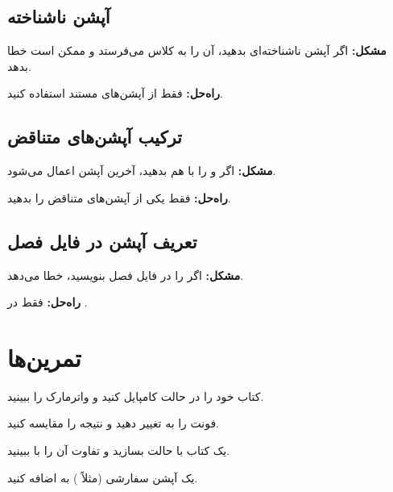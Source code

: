 \subsection{آپشن ناشناخته}
\label{sec:options-mistake-unknown}

\textbf{مشکل:} اگر آپشن ناشناخته‌ای بدهید،
 آن را به کلاس  می‌فرستد
و ممکن است خطا بدهد.

\textbf{راه‌حل:} فقط از آپشن‌های مستند استفاده
کنید.

\subsection{ترکیب آپشن‌های متناقض}
\label{sec:options-mistake-conflict}

\textbf{مشکل:} اگر  و  را
با هم بدهید، آخرین آپشن اعمال می‌شود.

\textbf{راه‌حل:} فقط یکی از آپشن‌های متناقض
را بدهید.

\subsection{تعریف آپشن در فایل فصل}
\label{sec:options-mistake-chapter}

\textbf{مشکل:} اگر  را در
فایل فصل بنویسید، خطا می‌دهد.

\textbf{راه‌حل:}  فقط در
.

\section{تمرین‌ها}
\label{sec:options-exercises}

\begin{exercise}
    کتاب خود را در حالت  کامپایل
    کنید و واترمارک را ببینید.
    \label{exc:options-draft}
\end{exercise}

\begin{exercise}
    فونت را به  تغییر دهید و
    نتیجه را مقایسه کنید.
    \label{exc:options-font}
\end{exercise}

\begin{exercise}
    یک کتاب با حالت  بسازید و
    تفاوت آن را با  ببینید.
    \label{exc:options-side}
\end{exercise}

\begin{exercise}
    یک آپشن سفارشی (مثلاً ) به
     اضافه کنید.
    \label{exc:options-custom}
\end{exercise}

